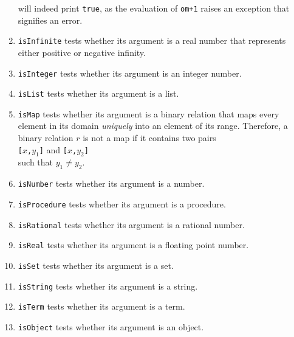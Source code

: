 \begin{enumerate}
      will indeed print \texttt{true}, as the evaluation of \texttt{om+1}
      raises an exception that signifies an error.
\item \texttt{isInfinite} tests whether its argument is a real number that represents
      either positive or negative infinity.
\item \texttt{isInteger} tests whether its argument is an integer number.
\item \texttt{isList} tests whether its argument is a list.
\item \texttt{isMap} tests whether its argument is a binary relation that maps every
      element in its domain \emph{uniquely} into an element of its range.  Therefore, a
      binary relation $r$ is not a map if it contains two pairs
      \\[0.2cm]
      \hspace*{1.3cm}
      \texttt{[$x$,$y_1$]} \quad and \texttt{[$x$,$y_2$]}
      \\[0.2cm]
      such that $y_1 \not= y_2$.
\item \texttt{isNumber} tests whether its argument is a number.
\item \texttt{isProcedure} tests whether its argument is a procedure.
\item \texttt{isRational} tests whether its argument is a rational number.
\item \texttt{isReal} tests whether its argument is a floating point number.
\item \texttt{isSet} tests whether its argument is a set.
\item \texttt{isString} tests whether its argument is a string.
\item \texttt{isTerm} tests whether its argument is a term.
\item \texttt{isObject} tests whether its argument is an object.
\end{enumerate}

